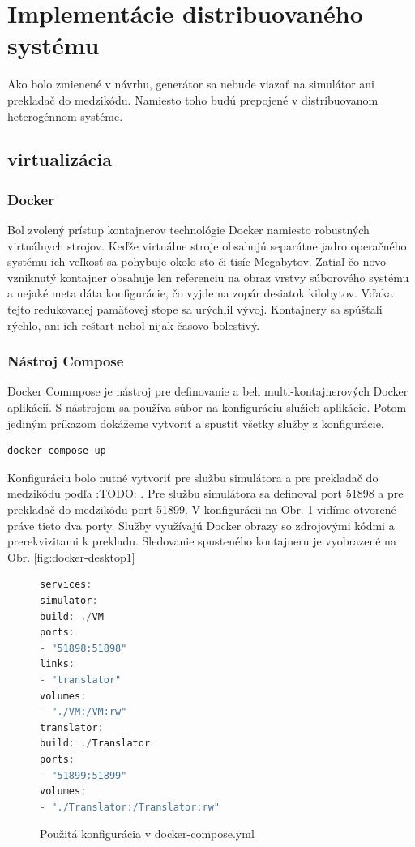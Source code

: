 \section{Implementácie distribuovaného systému}
Ako bolo zmienené v návrhu, generátor sa nebude viazať na simulátor ani prekladač do medzikódu. Namiesto toho budú prepojené v distribuovanom heterogénnom systéme.

\subsection{virtualizácia}

\subsubsection{Docker}
Bol zvolený prístup kontajnerov technológie Docker namiesto robustných virtuálnych strojov. Keďže virtuálne stroje obsahujú separátne jadro operačného systému ich veľkosť sa pohybuje okolo sto či tisíc Megabytov. Zatiaľ čo novo vzniknutý kontajner obsahuje len referenciu na obraz vrstvy súborového systému a nejaké meta dáta konfigurácie, čo vyjde na zopár desiatok kilobytov. \cite{kane2018docker} Vďaka tejto redukovanej pamäťovej stope sa urýchlil vývoj. Kontajnery sa spúšťali rýchlo, ani ich reštart nebol nijak časovo bolestivý.

\subsubsection{Nástroj Compose}

Docker Commpose je nástroj pre definovanie a beh multi-kontajnerových Docker aplikácií. S nástrojom sa používa súbor na konfiguráciu služieb aplikácie. Potom jediným príkazom dokážeme vytvoriť a spustiť všetky služby z konfigurácie. \cite{docker_docs}

\begin{lstlisting}[language=C++]
docker-compose up
\end{lstlisting}

Konfiguráciu bolo nutné vytvoriť pre službu simulátora a pre prekladač do medzikódu podľa :TODO: . Pre službu simulátora sa definoval port 51898 a pre prekladač do medzikódu port 51899. V konfigurácii na Obr. \ref{fig:docker-compose} vidíme otvorené práve tieto dva porty. Služby využívajú Docker obrazy so zdrojovými kódmi a prerekvizitami k prekladu. Sledovanie spusteného kontajneru je vyobrazené na Obr. \ref{fig:docker-desktop1}

\begin{figure}[H]
	\centering
\begin{lstlisting}[language=C++]
services:
simulator:
build: ./VM
ports:
- "51898:51898"
links: 
- "translator"
volumes: 
- "./VM:/VM:rw"
translator:
build: ./Translator
ports:
- "51899:51899"
volumes:
- "./Translator:/Translator:rw"
\end{lstlisting}
\caption{Použitá konfigurácia v docker-compose.yml}
\label{fig:docker-compose}
\end{figure}


